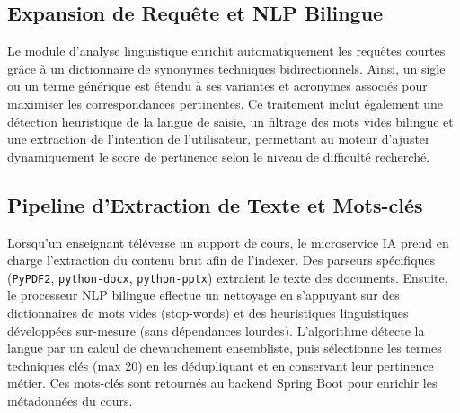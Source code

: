 \documentclass[12pt,a4paper]{report}
\begin{document}
\subsection{Expansion de Requête et NLP Bilingue}

Le module d'analyse linguistique enrichit automatiquement les requêtes courtes grâce à un dictionnaire de synonymes techniques bidirectionnels. Ainsi, un sigle ou un terme générique est étendu à ses variantes et acronymes associés pour maximiser les correspondances pertinentes. Ce traitement inclut également une détection heuristique de la langue de saisie, un filtrage des mots vides bilingue et une extraction de l'intention de l'utilisateur, permettant au moteur d'ajuster dynamiquement le score de pertinence selon le niveau de difficulté recherché.

\subsection{Pipeline d'Extraction de Texte et Mots-clés}

Lorsqu'un enseignant téléverse un support de cours, le microservice IA prend en charge l'extraction du contenu brut afin de l'indexer. Des parseurs spécifiques (\texttt{PyPDF2}, \texttt{python-docx}, \texttt{python-pptx}) extraient le texte des documents. Ensuite, le processeur NLP bilingue effectue un nettoyage en s'appuyant sur des dictionnaires de mots vides (stop-words) et des heuristiques linguistiques développées sur-mesure (sans dépendances lourdes). L'algorithme détecte la langue par un calcul de chevauchement ensembliste, puis sélectionne les termes techniques clés (max 20) en les dédupliquant et en conservant leur pertinence métier. Ces mots-clés sont retournés au backend Spring Boot pour enrichir les métadonnées du cours.
\end{document}
